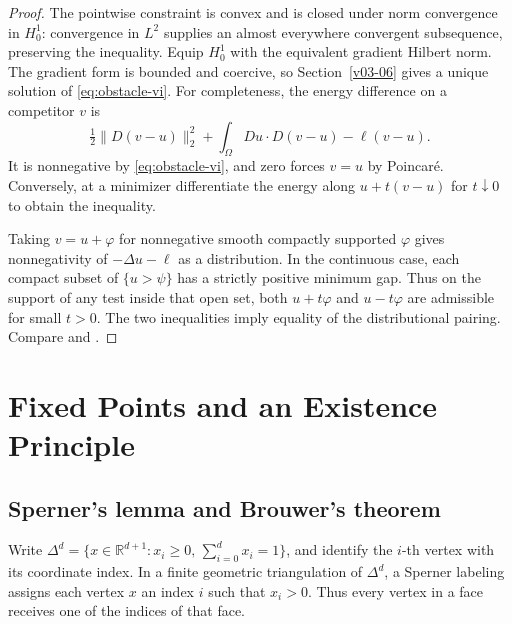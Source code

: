 \documentclass[11pt,oneside,openany]{book}
\newcommand{\norm}[1]{\lVert #1\rVert}
\theoremstyle{plain}
\theoremstyle{definition}
\theoremstyle{remark}
\begin{document}
\begin{proof}
The pointwise constraint is convex and is closed under norm
convergence in \(H^1_0\): convergence in \(L^2\) supplies
an almost everywhere convergent subsequence, preserving
the inequality. Equip \(H^1_0\) with the equivalent gradient
Hilbert norm. The gradient form is bounded and coercive,
so Section~\ref{v03-06} gives a unique solution of
\eqref{eq:obstacle-vi}. For completeness, the energy
difference on a competitor \(v\) is
\[
 \tfrac12\norm{D(v-u)}_2^2+
 \int_\Omega Du\cdot D(v-u)-\ell(v-u).
\]
It is nonnegative by \eqref{eq:obstacle-vi}, and zero
forces \(v=u\) by Poincar\'e. Conversely, at a minimizer
differentiate the energy along \(u+t(v-u)\) for \(t\downarrow0\)
to obtain the inequality.

Taking \(v=u+\varphi\) for nonnegative smooth compactly
supported \(\varphi\) gives nonnegativity of
\(-\Delta u-\ell\) as a distribution. In the continuous case,
each compact subset of \(\{u>\psi\}\) has a strictly positive
minimum gap. Thus on the support of any test inside that open
set, both \(u+t\varphi\) and \(u-t\varphi\) are admissible for
small \(t>0\). The two inequalities imply equality of the
distributional pairing. Compare
\cite[Chapter II, Section 2, and Chapter IV, Section 3]{EkelandTemam}
and \cite[Section 5.3]{Brezis}.
\end{proof}
\chapter{Fixed Points and an Existence Principle}

\section{Sperner's lemma and Brouwer's theorem}
\label{v10-01}

Write \(\Delta^d=\{x\in\mathbb R^{d+1}:x_i\ge0,\,
\sum_{i=0}^d x_i=1\}\), and identify the \(i\)-th vertex with its
coordinate index. In a finite geometric triangulation of \(\Delta^d\),
a Sperner labeling assigns each vertex \(x\) an index \(i\)
such that \(x_i>0\). Thus every vertex in a face receives one of
the indices of that face.
\end{document}
